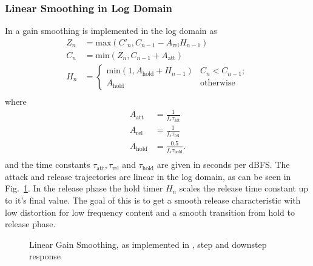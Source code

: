 \documentclass[../main2.tex]{subfiles}
\providecommand{\rootdir}{..}
\begin{document}
\subsubsection{Linear Smoothing in Log Domain}
In \cite{frindle1996implementation} a gain smoothing is implemented in the log domain as
\begin{equation}
\begin{split}
Z_n &= \text{max}(C'_n, C_{n-1} - A_{\text{rel}} H_{n-1} )\\
C_n &= \text{min}(Z_n, C_{n-1} + A_{\text{att}}) \\
H_n &=
\begin{cases}
    \text{min}(1,A_{\text{hold}} + H_{n-1})	& C_n < C_{n-1}; \\
    A_{\text{hold}}					& \text{otherwise}
\end{cases} \\
\end{split}
\end{equation}
where
\begin{equation}
\begin{split}
A_{\text{att}} &= \frac{1}{f_s \tau_{\text{att}}} \\
A_{\text{rel}} &= \frac{1}{f_s \tau_{\text{rel}}} \\
A_{\text{hold}} &= \frac{0.5}{f_s \tau_{\text{hold}}}. \\
\end{split}
\end{equation}
and the time constants $\tau_{\text{att}}, \tau_{\text{rel}}$ and $\tau_{\text{hold}}$ are given in seconds per dBFS. The attack and release trajectories are linear in the log domain, as can be seen in Fig.~\ref{fig:step_frindle_gain}. In the release phase the hold timer $H_n$ scales the release time constant up to it's final value. The goal of this is to get a smooth release characteristic with low distortion for low frequency content and a smooth transition from hold to release phase.
\begin{figure}[h]
\centerline{}
\caption{Linear Gain Smoothing, as implemented in \cite{frindle1996implementation}, step and downstep response}
\label{fig:step_frindle_gain}
\end{figure}
\end{document}
